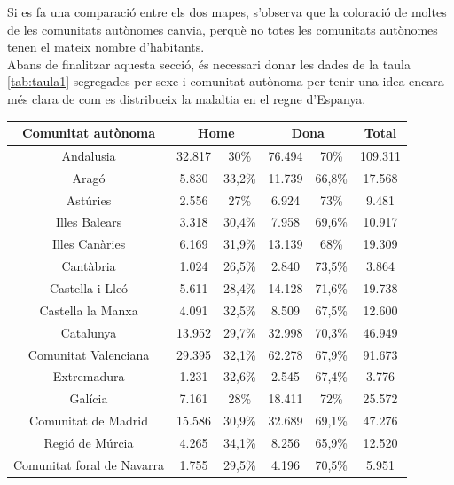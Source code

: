 \documentclass[a4paper,12pt]{article}
\begin{document}
Si es fa una comparació entre els dos mapes, s'observa que la coloració de moltes de les comunitats autònomes canvia, perquè no totes les comunitats autònomes tenen el mateix nombre d'habitants.\\
Abans de finalitzar aquesta secció, és necessari donar les dades de la taula \ref{tab:taula1} segregades per sexe i comunitat autònoma per tenir una idea encara més clara de com es distribueix la malaltia en el regne d'Espanya.
\begin{table}[h]
    \centering
    \begin{tabular}{ |c | c | c | c | c | c | } 
        \hline
        \hline Comunitat autònoma & \multicolumn{2}{|c|}{Home} & \multicolumn{2}{|c|}{Dona} & Total\\
        \hline
        Andalusia & 32.817 & 30\% & 76.494 & 70\% & 109.311\\
        \hline
        Aragó & 5.830 & 33,2\% & 11.739 & 66,8\% & 17.568\\
        \hline
        Astúries & 2.556 & 27\% & 6.924 & 73\% & 9.481\\
        \hline
        Illes Balears & 3.318 & 30,4\% & 7.958 & 69,6\% & 10.917\\
        \hline
        Illes Canàries & 6.169 & 31,9\% & 13.139 & 68\% & 19.309\\
        \hline
        Cantàbria & 1.024 & 26,5\% & 2.840 & 73,5\% & 3.864\\
         \hline
        Castella i Lleó & 5.611 & 28,4\% & 14.128 & 71,6\% & 19.738\\
         \hline
        Castella la Manxa & 4.091 & 32,5\% & 8.509 & 67,5\% & 12.600\\
         \hline
        Catalunya & 13.952 & 29,7\% & 32.998 & 70,3\% & 46.949\\
         \hline
        Comunitat Valenciana & 29.395 & 32,1\% & 62.278 & 67,9\% & 91.673\\
         \hline
        Extremadura & 1.231 & 32,6\% & 2.545 & 67,4\% & 3.776\\
         \hline
        Galícia & 7.161 & 28\% & 18.411 & 72\% & 25.572\\
         \hline
        Comunitat de Madrid & 15.586 & 30,9\% & 32.689 & 69,1\% & 47.276\\
         \hline
        Regió de Múrcia & 4.265 & 34,1\% & 8.256 & 65,9\% & 12.520\\
         \hline
        Comunitat foral de Navarra & 1.755 & 29,5\% & 4.196 & 70,5\% & 5.951\\

\end{tabular}
\end{table}
\end{document}

